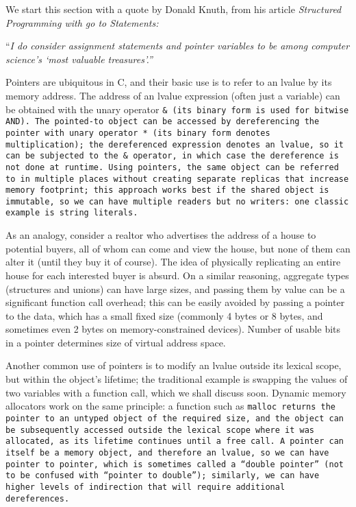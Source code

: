 \def\Subsection#1{\subsection{#1}}

We start this section with a quote by Donald Knuth,
from his article \it{Structured Programming with go to Statements}:

``\it{I do consider assignment statements and pointer variables
to be among computer science's `most valuable treasures'.}''

Pointers are ubiquitous in C,
and their basic use is to refer to an lvalue by its memory address.
The address of an lvalue expression (often just a variable) can be obtained
with the unary operator \tt{&} (its binary form is used for bitwise AND).
The pointed-to object can be accessed by dereferencing the pointer
with unary operator \tt{*} (its binary form denotes multiplication);
the dereferenced expression denotes an lvalue, so it can be subjected to
the \tt{&} operator, in which case the dereference is not done at runtime.
Using pointers, the same object can be referred to in multiple places
without creating separate replicas that increase memory footprint;
this approach works best if the shared object is immutable, so we can have
multiple readers but no writers: one classic example is string literals.

As an analogy, consider a realtor who advertises the address of a
house to potential buyers, all of whom can come and view the house,
but none of them can alter it (until they buy it of course).
The idea of physically replicating an entire
house for each interested buyer is absurd.
On a similar reasoning, aggregate types (structures and unions) can have large
sizes, and passing them by value can be a significant function call overhead;
this can be easily avoided by passing a pointer to the data,
which has a small fixed size (commonly 4 bytes or 8 bytes,
and sometimes even 2 bytes on memory-constrained devices).
Number of usable bits in a pointer determines size of virtual address space.

Another common use of pointers is to modify an lvalue outside its lexical scope,
but within the object's lifetime;
the traditional example is swapping the values of two
variables with a function call, which we shall discuss soon.
Dynamic memory allocators work on the same principle:
a function such as \tt{malloc} returns the pointer to an untyped object of the
required size, and the object can be subsequently accessed outside the lexical
scope where it was allocated, as its lifetime continues until a \tt{free} call.
A pointer can itself be a memory object, and therefore an lvalue, so we
can have pointer to pointer, which is sometimes called a ``double pointer''
(not to be confused with ``pointer to \tt{double}''); similarly, we can
have higher levels of indirection that will require additional dereferences.

